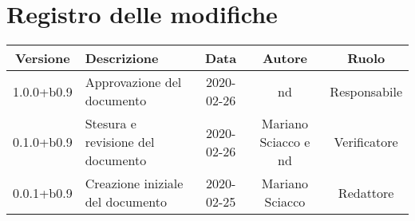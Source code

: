 \section*{Registro delle modifiche}

\begin{center}
	\begin{longtable}{|c|p{3cm}|c|c|c|}
	\hline
	\rowcolor{lighter-grayer}
	\textbf{Versione} & \textbf{Descrizione} & \textbf{Data} & \textbf{Autore} & \textbf{Ruolo} \\
	\hline
	\endfirsthead


	1.0.0+b0.9 & Approvazione del documento & 2020-02-26 & nd & Responsabile \\
	\hline
	0.1.0+b0.9 & Stesura e revisione del documento & 2020-02-26 & Mariano Sciacco e nd & Verificatore \\
	\hline
	0.0.1+b0.9 & Creazione iniziale del documento & 2020-02-25 & Mariano Sciacco & Redattore \\
	\hline

	\end{longtable}
\end{center}